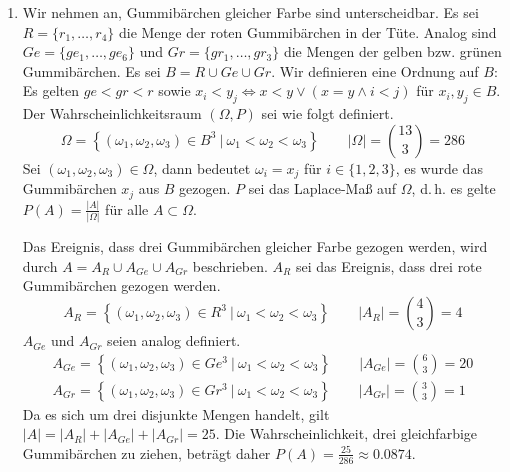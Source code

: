 \documentclass[a4paper]{scrartcl}
\newcommand{\gdw}{\Leftrightarrow}
\begin{document}
\begin{enumerate}[label=\bfseries\arabic*.]
    \item
        Wir nehmen an, Gummibärchen gleicher Farbe sind unterscheidbar.
        Es sei $R = \{ r_1, \ldots, r_4 \}$ die Menge der roten Gummibärchen
        in der Tüte.
        Analog sind $Ge = \{ ge_1, \ldots, ge_6 \}$ und
        $Gr = \{ gr_1, \ldots, gr_3 \}$ die Mengen der gelben bzw. grünen
        Gummibärchen.
        Es sei $B = R \cup Ge \cup Gr$.
        Wir definieren eine Ordnung auf $B$: Es gelten $ge < gr < r$ sowie
        $x_i < y_j \gdw x < y \lor (x = y \land i < j)$ für $x_i, y_j \in B$.
        Der Wahrscheinlichkeitsraum $(\Omega, P)$ sei wie folgt definiert.
        \begin{equation}
            \Omega = \left\{ (\omega_1, \omega_2, \omega_3) \in B^3 \ \vert \ 
            \omega_1 < \omega_2 < \omega_3 \right\}
            \qquad
            |\Omega| = \binom{13}{3} = 286
        \end{equation}
        Sei $(\omega_1, \omega_2, \omega_3) \in \Omega$, dann bedeutet
        $\omega_i = x_j$ für $i \in \{ 1, 2, 3 \}$, es wurde das Gummibärchen
        $x_j$ aus $B$ gezogen.
        $P$ sei das Laplace-Maß auf $\Omega$, d.\,h. es gelte
        $P(A) = \frac{|A|}{|\Omega|}$ für alle $A \subset \Omega$.

        Das Ereignis, dass drei Gummibärchen gleicher Farbe gezogen werden, wird
        durch $A = A_R \cup A_{Ge} \cup A_{Gr}$ beschrieben.
        $A_R$ sei das Ereignis, dass drei rote Gummibärchen gezogen werden.
        \begin{equation}
            A_R = \left\{ (\omega_1, \omega_2, \omega_3) \in R^3 \ \vert \ 
            \omega_1 < \omega_2 < \omega_3 \right\}
            \qquad
            |A_R| = \binom{4}{3} = 4
        \end{equation}
        $A_{Ge}$ und $A_{Gr}$ seien analog definiert.
        \begin{gather}
            A_{Ge} = \left\{ (\omega_1, \omega_2, \omega_3) \in Ge^3 \ \vert \ 
            \omega_1 < \omega_2 < \omega_3 \right\}
            \qquad
            |A_{Ge}| = \binom{6}{3} = 20 \\
            A_{Gr} = \left\{ (\omega_1, \omega_2, \omega_3) \in Gr^3 \ \vert \ 
            \omega_1 < \omega_2 < \omega_3 \right\}
            \qquad
            |A_{Gr}| = \binom{3}{3} = 1
        \end{gather}
        Da es sich um drei disjunkte Mengen handelt, gilt
        $|A| = |A_R| + |A_{Ge}| + |A_{Gr}| = 25$.
        Die Wahrscheinlichkeit, drei gleichfarbige Gummibärchen zu ziehen,
        beträgt daher $P(A) = \frac{25}{286} \approx \num{0,0874}$.
    

\end{enumerate}
\end{document}
